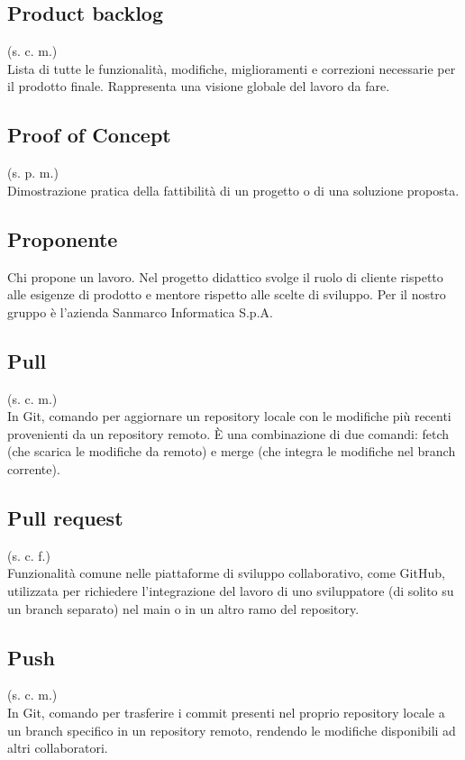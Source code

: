    \subsection{Product backlog}
    \label{Product backlog}
    (s. c. m.)\\
    Lista di tutte le funzionalità, modifiche, miglioramenti e correzioni necessarie 
    per il prodotto finale. Rappresenta una visione globale del lavoro da fare.
    \subsection{Proof of Concept}
    \label{Proof of Concept}
    (s. p. m.)\\
    Dimostrazione pratica della fattibilità di un progetto o di una soluzione proposta.
    \subsection{Proponente}
    \label{Proponente}
    Chi propone un lavoro. Nel progetto didattico svolge il ruolo di cliente 
    rispetto alle esigenze di prodotto e mentore rispetto alle scelte di sviluppo.
    Per il nostro gruppo è l'azienda Sanmarco Informatica S.p.A.
    \subsection{Pull}
    (s. c. m.)\\
    In Git, comando per aggiornare un repository locale con le modifiche più recenti provenienti 
    da un repository remoto. È una combinazione di due comandi: fetch (che scarica le modifiche 
    da remoto) e merge (che integra le modifiche nel branch corrente).
    \subsection{Pull request}
    (s. c. f.)\\
    Funzionalità comune nelle piattaforme di sviluppo collaborativo, come GitHub, utilizzata per 
    richiedere l'integrazione del lavoro di uno sviluppatore (di solito su un branch separato) 
    nel main o in un altro ramo del repository.
    \subsection{Push}
    (s. c. m.)\\
    In Git, comando per trasferire i commit presenti nel proprio repository locale a un 
    branch specifico in un repository remoto, rendendo le modifiche disponibili 
    ad altri collaboratori.

